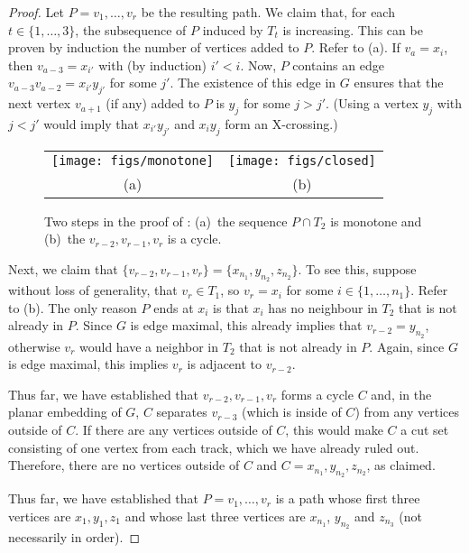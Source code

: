 \documentclass{patmorin}
\begin{document}
\begin{proof}
  Let $P=v_1,\ldots,v_r$ be the resulting path.  We claim that,
  for each $t\in \{1,\ldots,3\}$, the subsequence of $P$ induced by
  $T_t$ is increasing. This can be proven by induction the number of
  vertices added to $P$. Refer to (a).  If $v_a=x_i$,
  then $v_{a-3}=x_{i'}$ with (by induction) $i'< i$.  Now, $P$ contains
  an edge $v_{a-3}v_{a-2}=x_{i'}y_{j'}$ for some $j'$.  The existence of
  this edge in $G$ ensures that the next vertex $v_{a+1}$ (if any) added
  to $P$ is $y_j$ for some $j > j'$.  (Using a vertex $y_j$ with $j <
  j'$ would imply that $x_{i'}y_{j'}$ and $x_iy_j$ form an X-crossing.)

  \begin{figure}
    \begin{center}
       \begin{tabular}{cc}
         \texttt{[image: figs/monotone]} & \texttt{[image: figs/closed]} \\
         (a) & (b)
       \end{tabular}
    \end{center}
    \caption{Two steps in the proof of : (a)~the sequence $P\cap T_2$ is monotone and (b)~the $v_{r-2},v_{r-1},v_r$ is a cycle.}
  \end{figure}


  Next, we claim that
  $\{v_{r-2},v_{r-1},v_{r}\}=\{x_{n_1},y_{n_2},z_{n_2}\}$. To see this,
  suppose without loss of generality, that $v_r\in T_1$, so $v_r=x_i$
  for some $i\in\{1,\ldots,n_1\}$. Refer to (b). The only
  reason $P$ ends at $x_i$ is that $x_i$ has no neighbour in $T_{2}$
  that is not already in $P$.  Since $G$ is edge maximal, this already
  implies that $v_{r-2}=y_{n_2}$, otherwise $v_r$ would have a neighbor
  in $T_2$ that is not already in $P$.  Again, since $G$ is edge maximal,
  this implies $v_r$ is adjacent to $v_{r-2}$.

  Thus far, we have established that $v_{r-2},v_{r-1},v_{r}$ forms a
  cycle $C$ and, in the planar embedding of $G$, $C$ separates $v_{r-3}$
  (which is inside of $C$) from any vertices outside of $C$.  If there are
  any vertices outside of $C$, this would make $C$ a cut set consisting
  of one vertex from each track, which we have already ruled out.
  Therefore, there are no vertices outside of $C$ and 
  $C=x_{n_1},y_{n_2},z_{n_2}$, as claimed.

  Thus far, we have established that $P=v_1,\ldots,v_r$ is a path whose
  first three vertices are $x_1,y_1,z_1$ and whose last three vertices
  are $x_{n_1}$, $y_{n_2}$ and $z_{n_3}$ (not necessarily in order).


\end{proof}
\end{document}

